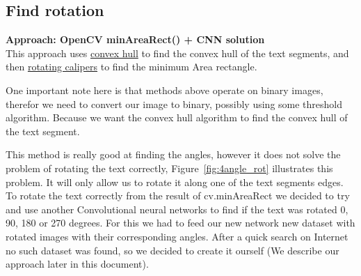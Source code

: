 \documentclass[Report.tex]{subfiles}
\begin{document}
\subsection{Find rotation}
\begin{flushleft}
  \textbf{Approach: OpenCV minAreaRect() + CNN solution} \\
  This approach uses \href{https://en.wikipedia.org/wiki/Convex_hull}{convex hull}
  to find the convex hull of the text segments, and then
  \href{https://en.wikipedia.org/wiki/Rotating_calipers}{rotating calipers} to
  find the minimum Area rectangle. \par
  One important note here is that methods above operate on binary images, therefor we need to convert our image to binary, possibly using some threshold algorithm. Because we want the convex hull algorithm to find the convex hull of the text segment. \par
  This method is really good at finding the angles, however it does not solve the problem of rotating the text correctly, Figure~\ref{fig:4angle_rot} illustrates
  this problem. It will only allow us to rotate it along one of the text segments edges. To rotate the text correctly from the result of cv.minAreaRect we decided to try and use another Convolutional neural networks to find if the text was rotated 0, 90, 180 or 270 degrees. For this we had to feed our new network new dataset with rotated images with their corresponding angles. After a quick search on Internet no such dataset was found, so we decided to create it  ourself (We describe our approach later in this document).


\end{flushleft}
\end{document}
